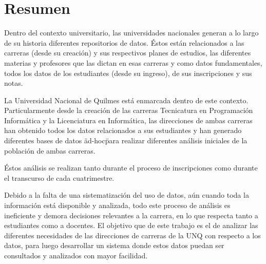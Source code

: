 \chapter*{Resumen}
Dentro del contexto universitario, las universidades nacionales generan a lo largo de su historia diferentes repositorios de datos. Éstos están relacionados a las carreras (desde su creación) y sus respectivos planes de estudios, las diferentes materias y profesores que las dictan en esas carreras y como datos fundamentales, todos los datos de los estudiantes (desde su ingreso), de sus inscripciones y sus notas.

La Universidad Nacional de Quilmes está enmarcada dentro de este contexto. Particularmente desde la creación de las carreras Tecnicatura en Programación Informática y la Licenciatura en Informática, las direcciones de ambas carreras han obtenido todos los datos relacionados a sus estudiantes y han generado diferentes bases de datos \"ad-hoc\" para realizar diferentes análisis iniciales de la población de ambas carreras.

Éstos análisis se realizan tanto durante el proceso de inscripciones como durante el transcurso de cada cuatrimestre.

Debido a la falta de una sistematización del uso de datos, aún cuando toda la información está disponible y analizada, todo este proceso de análisis es ineficiente y demora decisiones relevantes a la carrera, en lo que respecta tanto a estudiantes como a docentes.
El objetivo que de este trabajo es el de analizar las diferentes necesidades de las direcciones de carreras de la UNQ con respecto a los datos, para luego desarrollar un sistema donde estos datos puedan ser consultados y analizados con mayor facilidad.